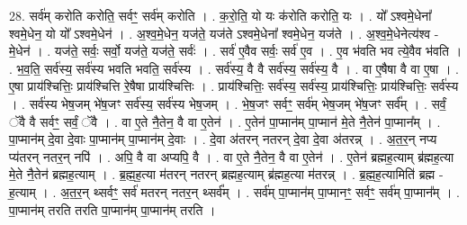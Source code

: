 \documentclass[17pt]{extarticle}
\begin{document}
28. सर्व॑म् करोति करोति॒ सर्वꣳ॒॒ सर्व॑म् करोति । . क॒रो॒ति॒ यो यः क॑रोति करोति॒ यः । . यो᳚ ऽश्वमे॒धेना᳚ श्वमे॒धेन॒ यो यो᳚ ऽश्वमे॒धेन॑ । . अ॒श्व॒मे॒धेन॒ यज॑ते॒ यज॑ते ऽश्वमे॒धेना᳚ श्वमे॒धेन॒ यज॑ते । . अ॒श्व॒मे॒धेनेत्य॑श्व - मे॒धेन॑ । . यज॑ते॒ सर्वः॒ सर्वो॒ यज॑ते॒ यज॑ते॒ सर्वः॑ । . सर्व॑ ए॒वैव सर्वः॒ सर्व॑ ए॒व । . ए॒व भ॑वति भव त्ये॒वैव भ॑वति । . भ॒व॒ति॒ सर्व॑स्य॒ सर्व॑स्य भवति भवति॒ सर्व॑स्य । . सर्व॑स्य॒ वै वै सर्व॑स्य॒ सर्व॑स्य॒ वै । . वा ए॒षैषा वै वा ए॒षा । . ए॒षा प्राय॑श्चित्तिः॒ प्राय॑श्चित्ति रे॒षैषा प्राय॑श्चित्तिः । . प्राय॑श्चित्तिः॒ सर्व॑स्य॒ सर्व॑स्य॒ प्राय॑श्चित्तिः॒ प्राय॑श्चित्तिः॒ सर्व॑स्य । . सर्व॑स्य भेष॒जम् भे॑ष॒जꣳ सर्व॑स्य॒ सर्व॑स्य भेष॒जम् । . भे॒ष॒जꣳ सर्वꣳ॒॒ सर्व॑म् भेष॒जम् भे॑ष॒जꣳ सर्व᳚म् । . सर्वं॒ ॅवै वै सर्वꣳ॒॒ सर्वं॒ ॅवै । . वा ए॒ते नै॒तेन॒ वै वा ए॒तेन॑ । . ए॒तेन॑ पा॒प्मान॑म् पा॒प्मान॑ मे॒ते नै॒तेन॑ पा॒प्मान᳚म् । . पा॒प्मान॑म् दे॒वा दे॒वाः पा॒प्मान॑म् पा॒प्मान॑म् दे॒वाः । . दे॒वा अ॑तरन् नतरन् दे॒वा दे॒वा अ॑तरन्न् । . अ॒त॒र॒न् नप्य प्य॑तरन् नतर॒न् नपि॑ । . अपि॒ वै वा अप्यपि॒ वै । . वा ए॒ते नै॒तेन॒ वै वा ए॒तेन॑ । . ए॒तेन॑ ब्रह्मह॒त्याम् ब्र॑ह्मह॒त्या मे॒ते नै॒तेन॑ ब्रह्मह॒त्याम् । . ब्र॒ह्म॒ह॒त्या म॑तरन् नतरन् ब्रह्मह॒त्याम् ब्र॑ह्मह॒त्या म॑तरन्न् । . ब्र॒ह्म॒ह॒त्यामिति॑ ब्रह्म - ह॒त्याम् । . अ॒त॒र॒न् थ्सर्वꣳ॒॒ सर्व॑ मतरन् नतर॒न् थ्सर्व᳚म् । . सर्व॑म् पा॒प्मान॑म् पा॒प्मानꣳ॒॒ सर्वꣳ॒॒ सर्व॑म् पा॒प्मान᳚म् । . पा॒प्मान॑म् तरति तरति पा॒प्मान॑म् पा॒प्मान॑म् तरति । \newline
\end{document}
